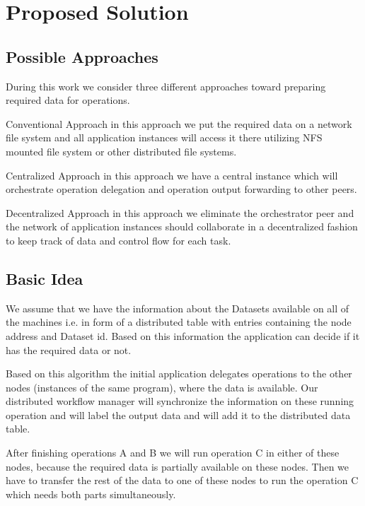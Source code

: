 \chapter{Proposed Solution}
\label{cha:proposal}

\section{Possible Approaches}
During this work we consider three different approaches toward preparing required data for operations.
\begin{description}
\item{Conventional Approach} in this approach we put the required data on a network file system and all
application instances will access it there utilizing NFS mounted file system or other distributed file systems.
\item{Centralized Approach} in this approach we have a central instance which will orchestrate operation
delegation and operation output forwarding to other peers.
\item{Decentralized Approach} in this approach we eliminate the orchestrator peer and the network of
application instances should collaborate in a decentralized fashion to keep track of data and control flow for each
task.
\end{description}

\section{Basic Idea}
We assume that we have the information about the Datasets
available on all of the machines i.e. in form of a distributed table
with entries containing the node address and Dataset id. Based on this
information the application can decide if it has the required data or
not. 

Based on this algorithm the initial application delegates operations to the other 
nodes (instances of the same program), where the data is available. 
Our distributed workflow manager will synchronize the information on these running operation and
will label the output data and will add it to the distributed data table.

After finishing operations A and B we will run operation C in either
of these nodes, because the required data is partially available on these
nodes. Then we have to transfer the rest of the data to one of these
nodes to run the operation C which needs both parts simultaneously.

